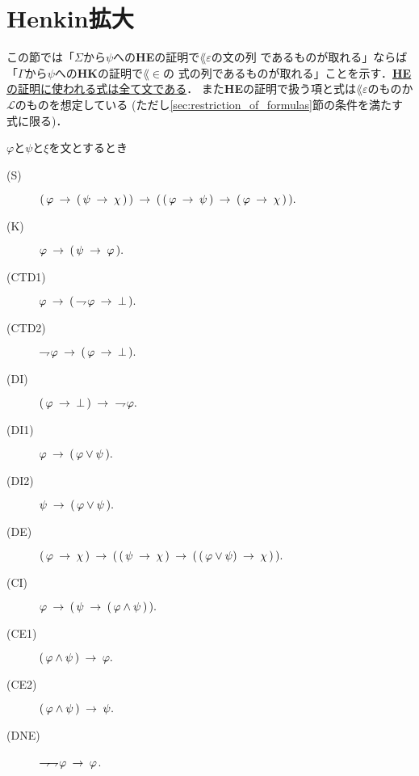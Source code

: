 \section{Henkin拡大}
\label{sec:Henkin_expansion}
	この節では「$\Sigma$から$\psi$への{\bf HE}の証明で$\lang{\varepsilon}$の文の列
	であるものが取れる」ならば「$\Gamma$から$\psi$への{\bf HK}の証明で$\lang{\in}$の
	式の列であるものが取れる」ことを示す．\underline{{\bf HE}の証明に使われる式は全て文である}．
	また{\bf HE}の証明で扱う項と式は$\lang{\varepsilon}$のものか$\mathcal{L}$のものを想定している
	(ただし\ref{sec:restriction_of_formulas}節の条件を満たす式に限る)．
	
	\begin{screen}
		\begin{logicalaxm}
			$\varphi$と$\psi$と$\xi$を文とするとき
			\begin{description}
				\item[(S)] $(\, \varphi \rarrow (\, \psi \rarrow \chi\, )\, ) 
					\rarrow (\, (\, \varphi \rarrow \psi\, )
					\rarrow (\, \varphi \rarrow \chi\, )\, ).$
				\item[(K)] $\varphi \rarrow (\, \psi \rarrow \varphi\, ).$
				\item[(CTD1)] $\varphi \rarrow (\, \negation \varphi \rarrow \bot\, ).$
				\item[(CTD2)] $\negation \varphi \rarrow (\, \varphi \rarrow \bot\, ).$
				\item[(DI)] $(\, \varphi \rarrow \bot\, ) \rarrow\ \negation \varphi.$
				\item[(DI1)] $\varphi \rarrow (\, \varphi \vee \psi\, ).$
				\item[(DI2)] $\psi \rarrow (\, \varphi \vee \psi\, ).$
				\item[(DE)] $(\, \varphi \rarrow \chi\, ) \rarrow 
					(\, (\, \psi \rarrow \chi\, ) 
					\rarrow (\, (\, \varphi \vee \psi) \rarrow \chi\, )\, ).$
				\item[(CI)] $\varphi \rarrow (\, \psi \rarrow (\, \varphi \wedge \psi\, )\, ).$
				\item[(CE1)] $(\, \varphi \wedge \psi\, ) \rarrow \varphi.$
				\item[(CE2)] $(\, \varphi \wedge \psi\, ) \rarrow \psi.$
				\item[(DNE)] $\negation \negation \varphi \rarrow \varphi$.
			\end{description}
		\end{logicalaxm}
	\end{screen}
	
